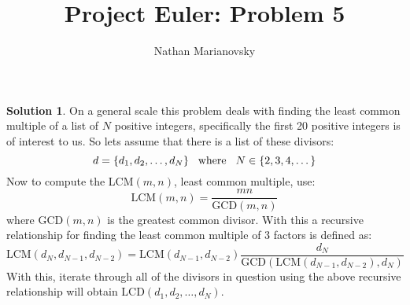 \documentclass[12pt, letterpaper, onecolumn, conference, final]{IEEEtran}
\title{Project Euler: Problem 5}
\author{Nathan Marianovsky}
\theoremstyle{definition}
\newtheorem*{problem*}{Problem}
\newtheorem*{solution*}{Solution}
\theoremstyle{plain}
\begin{document}
\maketitle

\begin{center}
\end{center}

\vspace{.3cm}
\begin{solution*}
On a general scale this problem deals with finding the least common multiple of a list of $N$ positive integers, specifically the first 20 positive integers is of interest to us. So lets assume that there is a list of these divisors:
\begin{equation*}
d = \{d_1,d_2,\dots,d_N\} \hspace{.3cm} \text{where} \hspace{.3cm} N \in \{2,3,4,\dots\}
\end{equation*}
Now to compute the LCM$(m,n)$, least common multiple, use:
\begin{equation*}
\text{LCM}(m,n) = \frac{mn}{\text{GCD}(m,n)}
\end{equation*}
where GCD$(m,n)$ is the greatest common divisor. With this a recursive relationship for finding the least common multiple of 3 factors is defined as:
\begin{equation*}
\text{LCM}(d_N,d_{N-1},d_{N-2}) = \text{LCM}(d_{N-1},d_{N-2}) \frac{d_N}{\text{GCD}(\text{LCM}(d_{N-1},d_{N-2}),d_N)}
\end{equation*}
With this, iterate through all of the divisors in question using the above recursive relationship will obtain LCD$(d_1,d_2,\dots,d_N)$.
\end{solution*}
\end{document}
